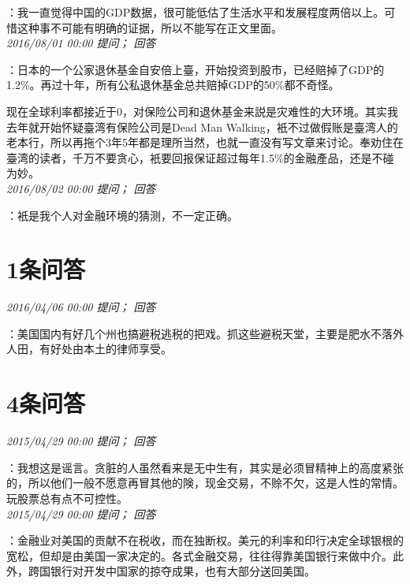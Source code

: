 \documentclass[twocolumn]{ctexart}
\begin{document}
：我一直觉得中国的GDP数据，很可能低估了生活水平和发展程度两倍以上。可惜这种事不可能有明确的证据，所以不能写在正文里面。\\

\textit{\hfill\noindent\small 2016/08/01 00:00 提问； 回答}

：日本的一个公家退休基金自安倍上臺，开始投资到股市，已经赔掉了GDP的1.2\%。再过十年，所有公私退休基金总共赔掉GDP的50\%都不奇怪。

现在全球利率都接近于0，对保险公司和退休基金来説是灾难性的大环境。其实我去年就开始怀疑臺湾有保险公司是Dead Man Walking，衹不过做假账是臺湾人的老本行，所以再拖个3年5年都是理所当然，也就一直没有写文章来讨论。奉劝住在臺湾的读者，千万不要贪心，衹要回报保证超过每年1.5\%的金融產品，还是不碰为妙。\\

\textit{\hfill\noindent\small 2016/08/02 00:00 提问； 回答}

：衹是我个人对金融环境的猜测，不一定正确。\\

\section{1条问答}

\textit{\hfill\noindent\small 2016/04/06 00:00 提问； 回答}

：美国国内有好几个州也搞避税逃税的把戏。抓这些避税天堂，主要是肥水不落外人田，有好处由本土的律师享受。\\

\section{4条问答}

\textit{\hfill\noindent\small 2015/04/29 00:00 提问； 回答}

：我想这是谣言。贪脏的人虽然看来是无中生有，其实是必须冒精神上的高度紧张的，所以他们一般不愿意再冒其他的険，现金交易，不赊不欠，这是人性的常情。玩股票总有点不可控性。\\

\textit{\hfill\noindent\small 2015/04/29 00:00 提问； 回答}

：金融业对美国的贡献不在税收，而在独断权。美元的利率和印行决定全球银根的宽松，但却是由美国一家决定的。各式金融交易，往往得靠美国银行来做中介。此外，跨国银行对开发中国家的掠夺成果，也有大部分送回美国。
\end{document}
